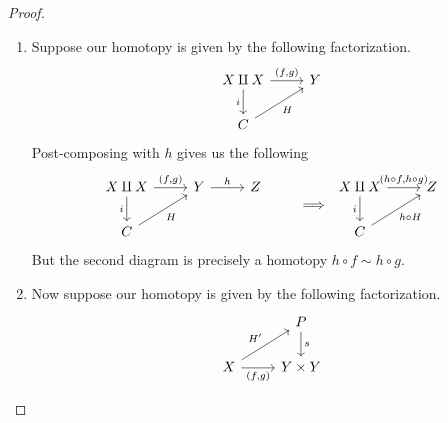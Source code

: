 \documentclass[main.tex]{subfiles}
\begin{document}
\begin{proof}
  \leavevmode
  \begin{enumerate}
    \item Suppose our homotopy is given by the following factorization.
      \begin{equation*}
        \begin{tikzcd}
          X \amalg X
          \arrow[d, swap, "i"]
          \arrow[r, "{(f, g)}"]
          & Y
          \\
          C
          \arrow[ur, swap, "H"]
        \end{tikzcd}
      \end{equation*}
      Post-composing with $h$ gives us the following
      \begin{equation*}
        \begin{tikzcd}
          X \amalg X
          \arrow[d, swap, "i"]
          \arrow[r, "{(f, g)}"]
          & Y
          \arrow[r, "h"]
          & Z
          \\
          C
          \arrow[ur, swap, "H"]
        \end{tikzcd}
        \qquad \implies
        \begin{tikzcd}
          X \amalg X
          \arrow[d, swap, "i"]
          \arrow[r, "{(h \circ f, h \circ g)}"]
          & Z
          \\
          C
          \arrow[ur, swap, "h \circ H"]
        \end{tikzcd}
      \end{equation*}
      But the second diagram is precisely a homotopy $h \circ f \sim h \circ g$.

    \item Now suppose our homotopy is given by the following factorization.
      \begin{equation*}
        \begin{tikzcd}
          & P
          \arrow[d, "s"]
          \\
          X
          \arrow[r, swap, "{(f, g)}"]
          \arrow[ur, "H'"]
          & Y \times Y
        \end{tikzcd}
      \end{equation*}


\end{enumerate}
\end{proof}
\end{document}
